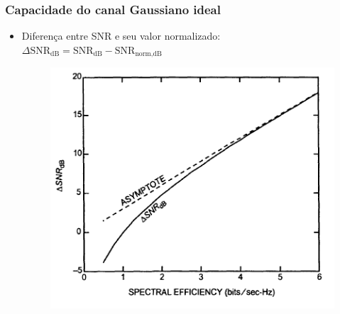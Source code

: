 \begin{frame}
	\frametitle{Capacidade do canal Gaussiano ideal}

	\begin{itemize}
	    \item Diferença entre SNR e seu valor normalizado: $\Delta \text{SNR}_{\text{dB}} = \text{SNR}_{\text{dB}} - \text{SNR}_{\text{norm,dB}}$
	    \begin{figure}[t]	
		\begin{center}
		\includegraphics[width=0.6\columnwidth]{figs/adv_30}
		\end{center}
	    \end{figure}
	\end{itemize}
\end{frame}

